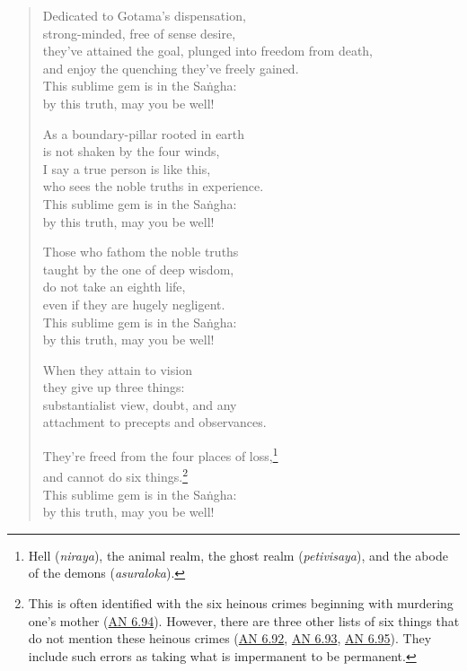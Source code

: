\documentclass[12pt,openany]{book}%
\begin{document}
\begin{verse}
Dedicated to Gotama’s dispensation, \\
strong-minded, free of sense desire, \\
they’ve attained the goal, plunged into freedom from death, \\
and enjoy the quenching they’ve freely gained. \\
This sublime gem is in the \textsanskrit{Saṅgha}: \\
by this truth, may you be well! 

As a boundary-pillar rooted in earth \\
is not shaken by the four winds, \\
I say a true person is like this, \\
who sees the noble truths in experience. \\
This sublime gem is in the \textsanskrit{Saṅgha}: \\
by this truth, may you be well! 

Those who fathom the noble truths \\
taught by the one of deep wisdom, \\
do not take an eighth life, \\
even if they are hugely negligent. \\
This sublime gem is in the \textsanskrit{Saṅgha}: \\
by this truth, may you be well! 

When they attain to vision \\
they give up three things: \\
substantialist view, doubt, and any \\
attachment to precepts and observances. 

They’re freed from the four places of loss,\footnote{Hell (\textit{niraya}), the animal realm, the ghost realm (\textit{petivisaya}), and the abode of the demons (\textit{asuraloka}). } \\
and cannot do six things.\footnote{This is often identified with the six heinous crimes beginning with murdering one’s mother (\href{https://suttacentral.net/an6.94/en/sujato}{AN 6.94}). However, there are three other lists of six things that do not mention these heinous crimes (\href{https://suttacentral.net/an6.92/en/sujato}{AN 6.92}, \href{https://suttacentral.net/an6.93/en/sujato}{AN 6.93}, \href{https://suttacentral.net/an6.95/en/sujato}{AN 6.95}). They include such errors as taking what is impermanent to be permanent. } \\
This sublime gem is in the \textsanskrit{Saṅgha}: \\
by this truth, may you be well! 


\end{verse}
\end{document}
